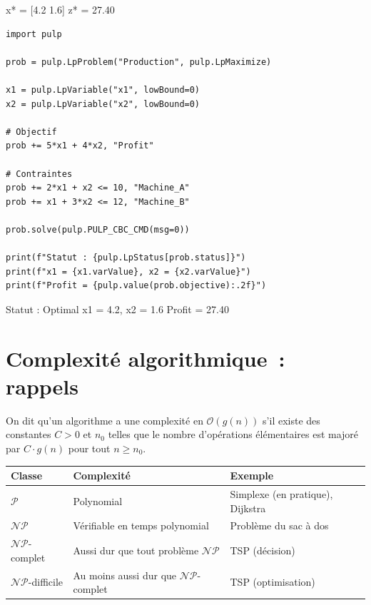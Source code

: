 \begin{codeoutput}
x* = [4.2 1.6]
z* = 27.40
\end{codeoutput}

\begin{codeblock}[title=\textbf{R\'esolution avec PuLP}]
\begin{verbatim}
import pulp

prob = pulp.LpProblem("Production", pulp.LpMaximize)

x1 = pulp.LpVariable("x1", lowBound=0)
x2 = pulp.LpVariable("x2", lowBound=0)

# Objectif
prob += 5*x1 + 4*x2, "Profit"

# Contraintes
prob += 2*x1 + x2 <= 10, "Machine_A"
prob += x1 + 3*x2 <= 12, "Machine_B"

prob.solve(pulp.PULP_CBC_CMD(msg=0))

print(f"Statut : {pulp.LpStatus[prob.status]}")
print(f"x1 = {x1.varValue}, x2 = {x2.varValue}")
print(f"Profit = {pulp.value(prob.objective):.2f}")
\end{verbatim}
\end{codeblock}

\begin{codeoutput}
Statut : Optimal
x1 = 4.2, x2 = 1.6
Profit = 27.40
\end{codeoutput}

\section{Complexit\'e algorithmique~: rappels}

\begin{definition}
On dit qu'un algorithme a une complexit\'e en $\mathcal{O}(g(n))$ s'il existe
des constantes $C > 0$ et $n_0$ telles que le nombre d'op\'erations \'el\'ementaires
est major\'e par $C \cdot g(n)$ pour tout $n \ge n_0$.
\end{definition}

\begin{center}
\renewcommand{\arraystretch}{1.2}
\begin{tabular}{lll}
  \toprule
  \textbf{Classe} & \textbf{Complexit\'e} & \textbf{Exemple} \\
  \midrule
  $\mathcal{P}$ & Polynomial & Simplexe (en pratique), Dijkstra \\
  $\mathcal{NP}$ & V\'erifiable en temps polynomial & Probl\`eme du sac \`a dos \\
  $\mathcal{NP}$-complet & Aussi dur que tout probl\`eme $\mathcal{NP}$ & TSP (d\'ecision) \\
  $\mathcal{NP}$-difficile & Au moins aussi dur que $\mathcal{NP}$-complet & TSP (optimisation) \\
  \bottomrule
\end{tabular}
\end{center}


